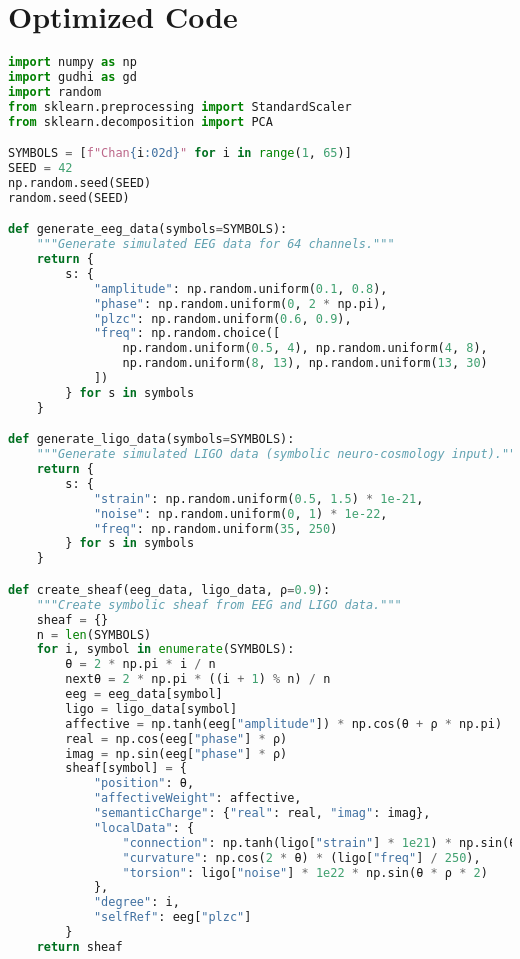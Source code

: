 \documentclass[11pt]{article}
\begin{document}
\section{Optimized Code}
\begin{lstlisting}[language=Python, basicstyle=\small\ttfamily, breaklines=true]
import numpy as np
import gudhi as gd
import random
from sklearn.preprocessing import StandardScaler
from sklearn.decomposition import PCA

SYMBOLS = [f"Chan{i:02d}" for i in range(1, 65)]
SEED = 42
np.random.seed(SEED)
random.seed(SEED)

def generate_eeg_data(symbols=SYMBOLS):
    """Generate simulated EEG data for 64 channels."""
    return {
        s: {
            "amplitude": np.random.uniform(0.1, 0.8),
            "phase": np.random.uniform(0, 2 * np.pi),
            "plzc": np.random.uniform(0.6, 0.9),
            "freq": np.random.choice([
                np.random.uniform(0.5, 4), np.random.uniform(4, 8),
                np.random.uniform(8, 13), np.random.uniform(13, 30)
            ])
        } for s in symbols
    }

def generate_ligo_data(symbols=SYMBOLS):
    """Generate simulated LIGO data (symbolic neuro-cosmology input)."""
    return {
        s: {
            "strain": np.random.uniform(0.5, 1.5) * 1e-21,
            "noise": np.random.uniform(0, 1) * 1e-22,
            "freq": np.random.uniform(35, 250)
        } for s in symbols
    }

def create_sheaf(eeg_data, ligo_data, ρ=0.9):
    """Create symbolic sheaf from EEG and LIGO data."""
    sheaf = {}
    n = len(SYMBOLS)
    for i, symbol in enumerate(SYMBOLS):
        θ = 2 * np.pi * i / n
        nextθ = 2 * np.pi * ((i + 1) % n) / n
        eeg = eeg_data[symbol]
        ligo = ligo_data[symbol]
        affective = np.tanh(eeg["amplitude"]) * np.cos(θ + ρ * np.pi)
        real = np.cos(eeg["phase"] * ρ)
        imag = np.sin(eeg["phase"] * ρ)
        sheaf[symbol] = {
            "position": θ,
            "affectiveWeight": affective,
            "semanticCharge": {"real": real, "imag": imag},
            "localData": {
                "connection": np.tanh(ligo["strain"] * 1e21) * np.sin(θ - nextθ),
                "curvature": np.cos(2 * θ) * (ligo["freq"] / 250),
                "torsion": ligo["noise"] * 1e22 * np.sin(θ * ρ * 2)
            },
            "degree": i,
            "selfRef": eeg["plzc"]
        }
    return sheaf


\end{lstlisting}
\end{document}
